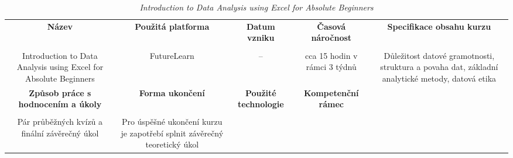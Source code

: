 \begin{landscape}

\begin{table}[htbp]

\renewcommand\thetable{8}

\caption{\textit{Introduction to Data Analysis using Excel for Absolute Beginners}}\label{tab8}

\footnotesize

{

\justifying

\begin{tabularx}{\linewidth}{CCCCC}

\toprule

\textbf{Název} &

\textbf{Použitá platforma} &

\textbf{Datum vzniku} &

\textbf{Časová náročnost} &
 
\textbf{Specifikace obsahu kurzu}

\\

\tabularnewline
\midrule

Introduction to Data Analysis using Excel for Absolute Beginners

&

FutureLearn

&

–

&

cca 15 hodin v rámci 3 týdnů

&

Důležitost datové gramotnosti, struktura a povaha dat, základní analytické metody, datová etika

\\
\toprule

\textbf{Způsob práce s hodnocením a úkoly} &

\textbf{Forma ukončení} &

\textbf{Použité technologie} &

\textbf{Kompetenční rámec} 

\\

\tabularnewline
\midrule

Pár průběžných kvízů a finální závěrečný úkol    

&

Pro úspěšné ukončení kurzu je zapotřebí splnit závěrečný teoretický úkol

&


\end{tabularx}}
\end{table}
\end{landscape}
